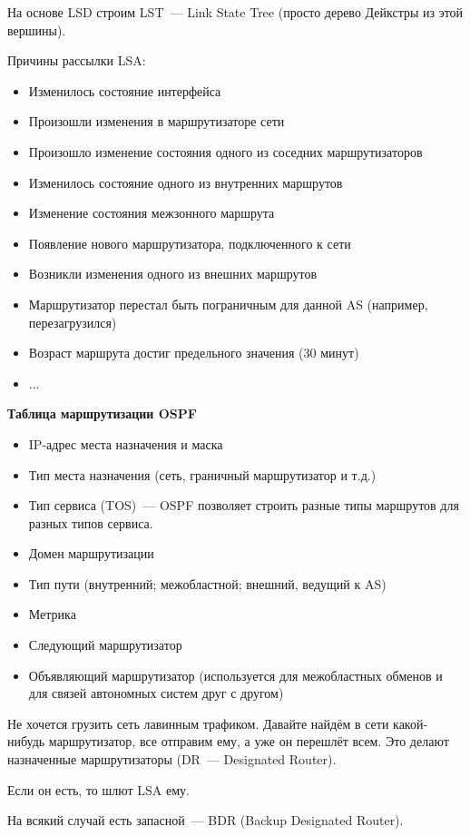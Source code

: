 На основе LSD строим LST~--- Link State Tree (просто дерево Дейкстры из этой вершины).


Причины рассылки LSA:
\begin{itemize}
    \item Изменилось состояние интерфейса
    \item Произошли изменения в маршрутизаторе сети
    \item Произошло изменение состояния одного из соседних маршрутизаторов
    \item Изменилось состояние одного из внутренних маршрутов
    \item Изменение состояния межзонного маршрута
    \item Появление нового маршрутизатора, подключенного к сети
    \item Возникли изменения одного из внешних маршрутов
    \item Маршрутизатор перестал быть пограничным для данной AS (например, перезагрузился)
    \item Возраст маршрута достиг предельного значения (30 минут)
    \item ...
\end{itemize}

{\bf Таблица маршрутизации OSPF}
\begin{itemize}
    \item IP-адрес места назначения и маска
    \item Тип места назначения (сеть, граничный маршрутизатор и т.д.)
    \item Тип сервиса (TOS)~--- OSPF позволяет строить разные типы маршрутов для разных типов сервиса. 
    \item Домен маршрутизации
    \item Тип пути (внутренний; межобластной; внешний, ведущий к AS)
    \item Метрика
    \item Следующий маршрутизатор
    \item Объявляющий маршрутизатор (используется для межобластных обменов и для связей автономных систем друг с другом)
\end{itemize}

Не хочется грузить сеть лавинным трафиком. Давайте найдём в сети какой-нибудь маршрутизатор, все отправим ему, а уже он перешлёт всем. Это делают назначенные маршрутизаторы (DR~--- Designated Router).

Если он есть, то шлют LSA ему.

На всякий случай есть запасной~--- BDR (Backup Designated Router).

